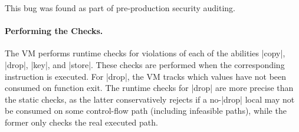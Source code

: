 \noindent This bug was found as part of pre-production security auditing.

\paragraph{Performing the Checks.}

The VM performs runtime checks for violations of each of the abilities |copy|, |drop|, |key|, and |store|.
These checks are performed when the corresponding instruction is executed.
For |drop|, the VM tracks which values have not been consumed on function exit.
The runtime checks for |drop| are more precise than the static checks, as the latter conservatively rejects if a no-|drop| local may not be consumed on some control-flow path (including infeasible paths), while the former only checks the real executed path.


